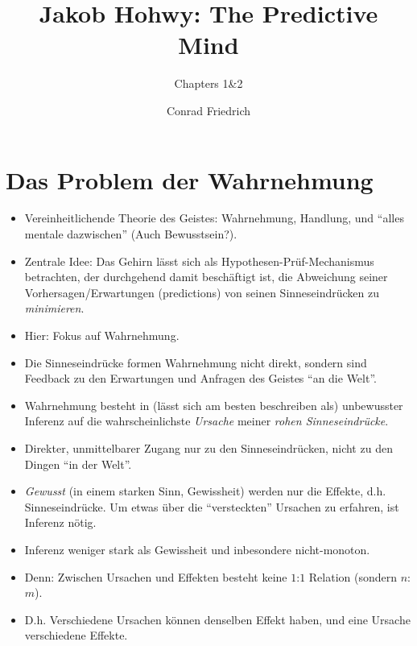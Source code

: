 \documentclass[11pt, handout]{beamer}
\title[The Predictive Mind]{Jakob Hohwy: The Predictive Mind}
\subtitle{Chapters 1\&2}
\author{Conrad Friedrich}
\institute[Uni Köln]{Universität zu Köln}
\begin{document}
\begin{frame}[plain]
  \maketitle
\end{frame}

\section{Das Problem der Wahrnehmung}

\begin{frame}
  \begin{itemize}[<+->]
  \item Vereinheitlichende Theorie des Geistes: Wahrnehmung, Handlung,
    und ``alles mentale dazwischen'' (Auch Bewusstsein?).
  \item Zentrale Idee: Das Gehirn lässt sich als
    Hypothesen-Prüf-Mechanismus betrachten, der durchgehend damit
    beschäftigt ist, die Abweichung seiner Vorhersagen/Erwartungen
    (predictions) von seinen Sinneseindrücken zu \emph{minimieren}.
  \item Hier: Fokus auf Wahrnehmung.
  \item Die Sinneseindrücke formen Wahrnehmung nicht direkt, sondern
    sind Feedback zu den Erwartungen und Anfragen des Geistes ``an die
    Welt''.
  \end{itemize}
\end{frame}

\begin{frame}
  \begin{itemize}[<+->]
  \item Wahrnehmung besteht in (lässt sich am besten beschreiben als)
    unbewusster Inferenz auf die wahrscheinlichste \emph{Ursache}
    meiner \emph{rohen Sinneseindrücke}.
  \item Direkter, unmittelbarer Zugang nur zu den Sinneseindrücken,
    nicht zu den Dingen ``in der Welt''.
  \item \emph{Gewusst} (in einem starken Sinn, Gewissheit) werden nur
    die Effekte, d.h. Sinneseindrücke. Um etwas über die
    ``versteckten'' Ursachen zu erfahren, ist Inferenz nötig.
  \item Inferenz weniger stark als Gewissheit und inbesondere
    nicht-monoton.
  \item Denn: Zwischen Ursachen und Effekten besteht keine $1$:$1$
    Relation (sondern $n$:$m$).
  \item D.h. Verschiedene Ursachen können denselben Effekt haben, und
    eine Ursache verschiedene Effekte.
  \end{itemize}
\end{frame}
\end{document}
